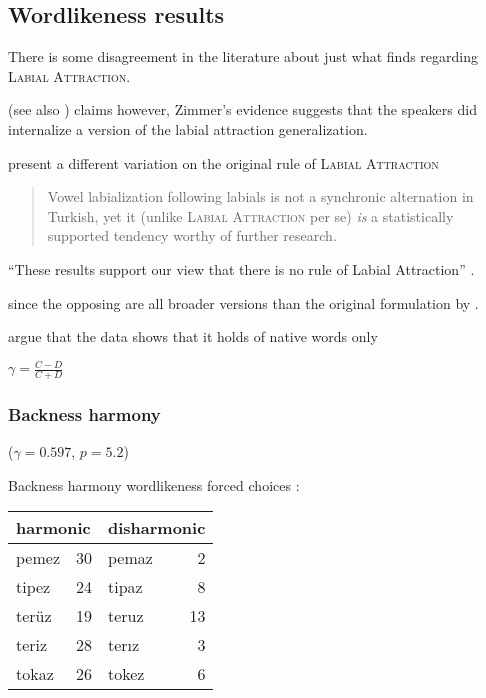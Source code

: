 \subsection{Wordlikeness results}

There is some disagreement in the literature about just what \citet{Zimmer1969} finds regarding \textsc{Labial Attraction}.

\citet{Zimmer1969}
(see also \citet[][4]{Zuraw2000})
claims however, Zimmer's evidence suggests that the speakers did internalize a version of the labial attraction generalization.

\citet{Inkelas2001} present a different variation on the original rule of \textsc{Labial Attraction}

\begin{quote}
Vowel labialization following labials is not a synchronic alternation in Turkish, yet it (unlike \textsc{Labial Attraction} per se) \emph{is} a statistically supported tendency worthy of further research. \citep[][196, emphasis in original]{Inkelas2001}
\end{quote}

``These results support our view that there is no rule of Labial Attraction'' \citep[][225]{Clements1982}.

since the opposing are all broader versions than the original formulation by \citeauthor{Lees1966a}.

\citet{Ito1993} argue that the data shows that it holds of native words only

\citet{Goodman1954}

\begin{example}
$\displaystyle \gamma = \frac{C - D}{C + D}$
\end{example}

\subsubsection{Backness harmony}

($\gamma = 0.597$, $p = 5.2$) 

\begin{example}
Backness harmony wordlikeness forced choices \citep[314]{Zimmer1969}: 

\vspace{0.5\baselineskip}
\begin{tabular}{l r l r}
\toprule
\multicolumn{2}{l}{harmonic} & \multicolumn{2}{l}{disharmonic} \\
\midrule
pemez & 30                   & pemaz & 2  \\
tipez & 24                   & tipaz & 8  \\ 
terüz & 19                   & teruz & 13 \\ %
teriz & 28                   & terız & 3  \\
tokaz & 26                   & tokez & 6  \\ %
\bottomrule
\end{tabular}
\end{example}

